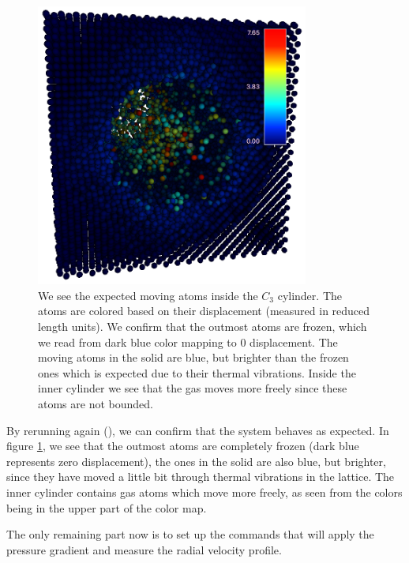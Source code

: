 \documentclass[12pt,a4paper,final]{iopart}
\begin{document}
\begin{figure}
	\centering
	\includegraphics[width=0.8\textwidth]{lj_flow/07_moving.png}
	\caption{
		We see the expected moving atoms inside the $C_3$ cylinder.
		The atoms are colored based on their displacement (measured in reduced length units).
		We confirm that the outmost atoms are frozen, which we read from dark blue color mapping to 0 displacement.
		The moving atoms in the solid are blue, but brighter than the frozen ones which is expected due to their thermal vibrations.
		Inside the inner cylinder we see that the gas moves more freely since these atoms are not bounded.
    }
	\label{fig:moving_atoms}
\end{figure}

By rerunning again (), we can confirm that the system behaves as expected.
In figure \ref{fig:moving_atoms}, we see that the outmost atoms are completely frozen (dark blue represents zero displacement),
the ones in the solid are also blue, but brighter, since they have moved a little bit through thermal vibrations in the lattice.
The inner cylinder contains gas atoms which move more freely, as seen from the colors being in the upper part of the color map.

The only remaining part now is to set up the commands that will apply the pressure gradient and measure the radial velocity profile.
\end{document}
